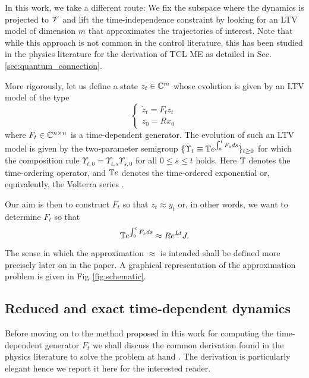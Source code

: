 \documentclass[10pt,aps,pra,twocolumn,showpacs,superscriptaddress,nobalancelastpage,notitlepage,nofootinbib,longbibliography]{revtex4-2}
\begin{document}
In this work, we take a different route: We fix the subspace where the dynamics is projected to $\mathscr{V}$ and lift the time-independence constraint by looking for an LTV model of dimension $m$ that approximates the trajectories of interest. Note that while this approach is not common in the control literature, this has been studied in the physics literature for the derivation of TCL ME as detailed in Sec. \ref{sec:quantum_connection}.

More rigorously, let us define a state $z_t\in\mathbb{C}^m$ whose evolution is given by an LTV model of the type
 \begin{equation}
    \begin{cases}
        \dot{z}_t = F_t z_t\\
        z_0 = R x_0
    \end{cases}
 \end{equation}
 where $F_t\in\mathbb{C}^{n\times n}$ is a time-dependent generator. The evolution of such an LTV model is given by the two-parameter semigroup $\{\Upsilon_t \equiv \mathbb{T} e^{\int_0^t F_s ds} \}_{t\geq0}$ for which the composition rule $\Upsilon_{t,0}=\Upsilon_{t,s}\Upsilon_{s,0}$ for all $0\leq s\leq t$ holds. Here $\mathbb{T}$ denotes the time-ordering operator, and $\mathbb{T} e$ denotes the time-ordered exponential or, equivalently, the Volterra series \cite{lawrence1979volterra,Giscard_2015}.  

Our aim is then to construct $F_t$ so that $z_t\approx y_t$ or, in other words, we want to determine $F_t$ so that \[\mathbb{T} e^{\int_0^t F_s ds} \approx R e^{L t} J.\] The sense in which the approximation $\approx$ is intended shall be defined more precisely later on in the paper. A graphical representation of the approximation problem is given in Fig.\,\ref{fig:schematic}.   

\subsection{Reduced and exact time-dependent dynamics}

Before moving on to the method proposed in this work for computing the time-dependent generator $F_t$ we shall discuss the common derivation found in the physics literature to solve the problem at hand \cite{Tokieda_2025, chaturvedi_time-convolutionless_1979, nestmann_time-convolutionless_2019, shibata_generalized_1977}. The derivation is particularly elegant hence we report it here for the interested reader. 
\end{document}
